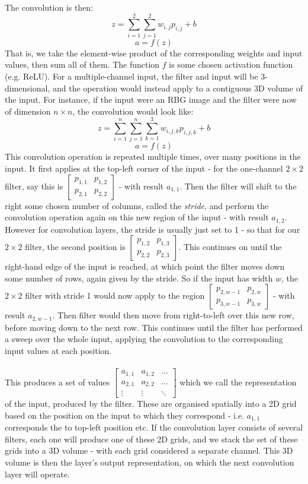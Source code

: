 \documentclass[11pt]{article} %
\theoremstyle{plain}
\theoremstyle{definition}
\begin{document}
The convolution is then:
\[ z = \sum_{i=1}^2 \sum_{j=1}^2 w_{i,j}p_{i,j} + b \]  
\[ a = f(z) \]
That is, we take the element-wise product of the corresponding weights and input values, then sum all of them. The function \(f\) is some chosen activation function (e.g. ReLU). For a multiple-channel input, the filter and input will be 3-dimensional, and the operation would instead apply to a contiguous 3D volume of the input. For instance, if the input were an RBG image and the filter were now of dimension \(n \times n\), the convolution would look like:
\[ z = \sum_{i=1}^n \sum_{j=1}^n \sum_{k=1}^3 w_{i,j,k}p_{i,j,k} + b \]
\[ a = f(z) \]
This convolution operation is repeated multiple times, over many positions in the input. It first applies at the top-left corner of the input - for the one-channel \(2 \times 2\) filter, say this is $\begin{bmatrix}p_{1,1} & p_{1,2}\\ p_{2,1} & p_{2,2}\end{bmatrix}$ - with result \(a_{1,1}\). Then the filter will shift to the right some chosen number of columns, called the \textit{stride}, and perform the convolution operation again on this new region of the input - with result \(a_{1,2}\). However for convolution layers, the stride is usually just set to 1 - so that for our \(2 \times 2\) filter, the second position is $\begin{bmatrix}p_{1,2} & p_{1,3}\\ p_{2,2} & p_{2,3}\end{bmatrix}$. This continues on until the right-hand edge of the input is reached, at which point the filter moves down some number of rows, again given by the stride. So if the input has width \(w\), the \(2 \times 2\) filter with stride 1 would now apply to the region $\begin{bmatrix}p_{2,w-1} & p_{2,w}\\ p_{3,w-1} & p_{3,w}\end{bmatrix}$ - with result \(a_{2,w-1}\). Then filter would then move from right-to-left over this new row, before moving down to the next row. This continues until the filter has performed a sweep over the whole input, applying the convolution to the corresponding input values at each position. 
\\
\\
\noindent
This produces a set of values $\begin{bmatrix}a_{1,1} & a_{1,2} & \dots \\ a_{2,1} & a_{2,2} & \dots \\ \vdots & \vdots & \ddots \end{bmatrix}$ which we call the representation of the input, produced by the filter. These are organised spatially into a 2D grid based on the position on the input to which they correspond - i.e. \(a_{1,1}\) corresponds the to top-left position etc. If the convolution layer consists of several filters, each one will produce one of these 2D grids, and we stack the set of these grids into a 3D volume - with each grid considered a separate channel. This 3D volume is then the layer's output representation, on which the next convolution layer will operate.         
\end{document}
